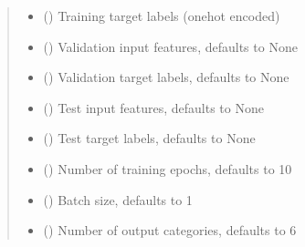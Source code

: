 \documentclass[letterpaper,10pt,english]{sphinxmanual}
\begin{document}
\begin{fulllineitems}
\begin{quote}
\begin{description}
\begin{itemize}
\item {} 
\sphinxAtStartPar
{} () \textendash{} Training target labels (one\sphinxhyphen{}hot encoded)

\item {} 
\sphinxAtStartPar
{} (\sphinxstyleliteralemphasis{\sphinxupquote{, }}) \textendash{} Validation input features, defaults to None

\item {} 
\sphinxAtStartPar
{} (\sphinxstyleliteralemphasis{\sphinxupquote{, }}) \textendash{} Validation target labels, defaults to None

\item {} 
\sphinxAtStartPar
{} (\sphinxstyleliteralemphasis{\sphinxupquote{, }}) \textendash{} Test input features, defaults to None

\item {} 
\sphinxAtStartPar
{} (\sphinxstyleliteralemphasis{\sphinxupquote{, }}) \textendash{} Test target labels, defaults to None

\item {} 
\sphinxAtStartPar
{} (\sphinxstyleliteralemphasis{\sphinxupquote{, }}) \textendash{} Number of training epochs, defaults to 10

\item {} 
\sphinxAtStartPar
{} (\sphinxstyleliteralemphasis{\sphinxupquote{, }}) \textendash{} Batch size, defaults to 1

\item {} 
\sphinxAtStartPar
{} (\sphinxstyleliteralemphasis{\sphinxupquote{, }}) \textendash{} Number of output categories, defaults to 6


\end{itemize}
\end{description}
\end{quote}
\end{fulllineitems}
\end{document}
